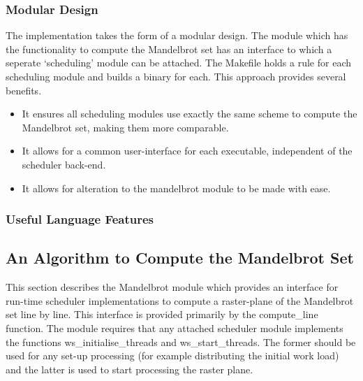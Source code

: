\subsubsection*{Modular Design}

The implementation takes the form of a modular design. The module which has the functionality to compute the Mandelbrot set
has an interface to which a seperate `scheduling' module can be attached. The Makefile holds a rule for each scheduling 
module and builds a binary for each. This approach provides several benefits. 

\begin{itemize}
\item It ensures all scheduling modules use exactly the same scheme to compute the Mandelbrot set, making them more comparable.
\item It allows for a common user-interface for each executable, independent of the scheduler back-end.
\item It allows for alteration to the mandelbrot module to be made with ease.
\end{itemize}

\subsubsection*{Useful Language Features}


\subsection{An Algorithm to Compute the Mandelbrot Set}
\label{sec:mandmod}

This section describes the Mandelbrot module which provides an interface for run-time scheduler implementations to 
compute a raster-plane of the Mandelbrot set line by line. 
This interface is provided primarily by the compute\_line function. 
The module requires that any attached scheduler module implements the functions
ws\_initialise\_threads and ws\_start\_threads. 
The former should be used for any set-up processing (for example distributing the initial 
work load) and the latter is used to start processing the raster plane.

